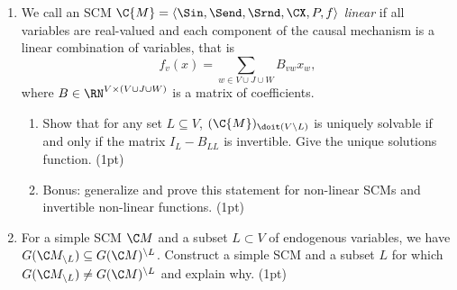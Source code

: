 \begin{enumerate}
\begin{gradedsolution}
\begin{enumerate}
			\item For any $y_* \in \mathbb{R}$, the function $\boldsymbol{g}_{y_*}: \boldsymbol{\mathcal{X}} \times \boldsymbol{\mathcal{Z}} = \{*\} \to \boldsymbol{\mathcal{Y}} = \mathbb{R}$ given by $\boldsymbol{g}_{y_*}(*) = y_*$ is a solution, since $\boldsymbol{f}(\boldsymbol{g}_{y_*}(*)) = \boldsymbol{g}_{y_*}(*)$ by definition of $\boldsymbol{f}$.
			Thus, there are infinitely many solutions.
			Intuitively, this is due to a ``cycle'' (to be defined in the lecture) in the corresponding causal graph.
		\end{enumerate}
	\end{gradedsolution}

	\item We call an SCM $\C{M}=\langle \Sin, \Send, \Srnd, \CX, P, f \rangle$
	\emph{linear} if all variables are real-valued and
	each component of the causal mechanism is a linear combination of variables, that is
	$$
		f_v(x) = \sum_{w\in V \cup J \cup W} B_{vw} x_w,
	$$
	where $B\in\RN^{V \times (V \cup J \cup W)}$ is a matrix of coefficients.

	\begin{enumerate}
		\item Show that for any set $L \subseteq V$, $(\C{M})_{\doit(V\setminus L)}$ is uniquely solvable if and only if the matrix $I_{L}-B_{LL}$ is invertible. Give the unique solutions function. (1pt)
		\item Bonus: generalize and prove this statement for non-linear SCMs and invertible non-linear functions. (1pt)
	\end{enumerate}

	\item For a simple SCM $\C M$ and a subset $L \subset V$ of endogenous variables, we have $G(\C M_{\setminus L}) \subseteq G(\C M)^{\setminus L}$. Construct a simple SCM and a subset $L$ for which $G(\C M_{\setminus L}) \neq G(\C M)^{\setminus L}$ and explain why. (1pt)


\end{enumerate}
